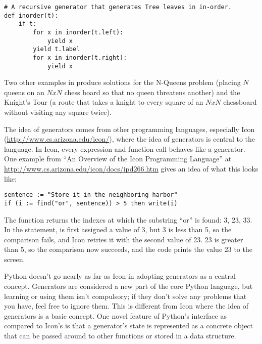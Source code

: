 \documentclass{howto}
\begin{document}
\begin{verbatim}
# A recursive generator that generates Tree leaves in in-order.
def inorder(t):
    if t:
        for x in inorder(t.left):
            yield x
        yield t.label
        for x in inorder(t.right):
            yield x
\end{verbatim}

Two other examples in  produce
solutions for the N-Queens problem (placing $N$ queens on an $NxN$
chess board so that no queen threatens another) and the Knight's Tour
(a route that takes a knight to every square of an $NxN$ chessboard
without visiting any square twice). 

The idea of generators comes from other programming languages,
especially Icon (\url{http://www.cs.arizona.edu/icon/}), where the
idea of generators is central to the language.  In Icon, every
expression and function call behaves like a generator.  One example
from ``An Overview of the Icon Programming Language'' at
\url{http://www.cs.arizona.edu/icon/docs/ipd266.htm} gives an idea of
what this looks like:

\begin{verbatim}
sentence := "Store it in the neighboring harbor"
if (i := find("or", sentence)) > 5 then write(i)
\end{verbatim}

The  function returns the indexes at which the
substring ``or'' is found: 3, 23, 33.  In the  statement,
 is first assigned a value of 3, but 3 is less than 5, so the
comparison fails, and Icon retries it with the second value of 23.  23
is greater than 5, so the comparison now succeeds, and the code prints
the value 23 to the screen.

Python doesn't go nearly as far as Icon in adopting generators as a
central concept.  Generators are considered a new part of the core
Python language, but learning or using them isn't compulsory; if they
don't solve any problems that you have, feel free to ignore them.
This is different from Icon where the idea of generators is a basic
concept.  One novel feature of Python's interface as compared to
Icon's is that a generator's state is represented as a concrete object
that can be passed around to other functions or stored in a data
structure.

\begin{seealso}


\end{seealso}
\end{document}
